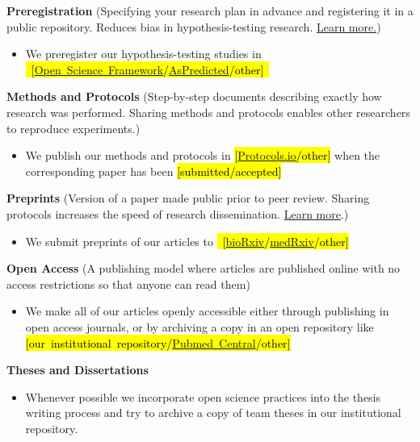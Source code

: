 \documentclass{article}
\begin{document}
\textbf{Preregistration} (Specifying your research plan in advance and registering it in a public repository. Reduces bias in hypothesis-testing research.
\href{http://www.psychologicalscience.org/observer/research-preregistration-101#.WR3GyFPyvOT}{Learn more.})

\begin{itemize}
\item We preregister our hypothesis-testing studies in \hl{\hbox{
[\href{https://osf.io/}{Open Science Framework}/\href{https://aspredicted.org/}{AsPredicted}/other]
}}

\end{itemize}
\textbf{Methods and Protocols} (Step-by-step documents describing exactly how research was performed. Sharing methods and protocols enables other researchers to reproduce experiments.)   

\begin{itemize}
\item We publish our methods and protocols in \hl{\hbox{[\href{https://www.protocols.io/}{Protocols.io}/other]}} when the corresponding paper has been \hl{[submitted/accepted]} 
\end{itemize}

\textbf{Preprints} (Version of a paper made public prior to peer review. Sharing protocols increases the speed of research dissemination. \href{https://plos.org/open-science/preprints/}{Learn more}.) 

\begin{itemize}
\item We submit preprints of our articles to \hl{\hbox{ [\href{https://www.biorxiv.org/}{bioRxiv}/\href{https://www.medrxiv.org/}{medRxiv}/other]}} 
\end{itemize}

\textbf{Open Access} (A publishing model where articles are published online with no access restrictions so that anyone can read them)

\begin{itemize}
\item We make all of our articles openly accessible either through publishing in open access journals, or by archiving a copy in an open repository like \hl{\hbox{[our institutional repository/\href{https://www.ncbi.nlm.nih.gov/pmc/}{Pubmed Central}/other]}}
\end{itemize}

\textbf{Theses and Dissertations}

\begin{itemize}
\item Whenever possible we incorporate open science practices into the thesis writing process and try to archive a copy of team theses in our institutional repository.
\end{itemize}
\end{document}
